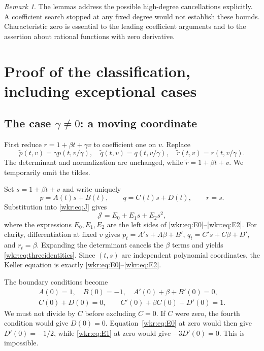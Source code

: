 \documentclass[11pt,a4paper]{article}
\numberwithin{equation}{section}
\theoremstyle{definition}
\theoremstyle{remark}
\newtheorem{remark}[theorem]{Remark}
\newcommand{\J}{\mathcal{J}}
\begin{document}
\begin{remark}
The lemmas address the possible high-degree cancellations explicitly. A
coefficient search stopped at any fixed degree would not establish these
bounds. Characteristic zero is essential to the leading coefficient
arguments and to the assertion about rational functions with zero derivative.
\end{remark}

\section{Proof of the classification, including exceptional cases}
\label{wkr:sec:proof}

\subsection{\texorpdfstring{The case $\gamma\ne0$: a moving coordinate}{The case gamma nonzero: a moving coordinate}}

First reduce $r=1+\beta t+\gamma v$ to coefficient one on $v$. Replace
\begin{equation}\label{wkr:eq:gammachange}
\widetilde p(t,v)=\gamma p(t,v/\gamma),\quad
\widetilde q(t,v)=q(t,v/\gamma),\quad
\widetilde r(t,v)=r(t,v/\gamma).
\end{equation}
The determinant and normalization are unchanged, while
$\widetilde r=1+\beta t+v$. We temporarily omit the tildes.

Set $s=1+\beta t+v$ and write uniquely
\begin{equation}\label{wkr:eq:ABCD}
p=A(t)s+B(t),\qquad q=C(t)s+D(t),\qquad r=s.
\end{equation}
Substitution into \eqref{wkr:eq:J} gives
\begin{equation}\label{wkr:eq:threeidentities}
\J=E_0+E_1s+E_2s^2,
\end{equation}
where the expressions $E_0,E_1,E_2$ are the left sides of
\eqref{wkr:eq:E0}--\eqref{wkr:eq:E2}. For clarity, differentiation at fixed $v$
gives $p_t=A's+A\beta+B'$, $q_t=C's+C\beta+D'$, and $r_t=\beta$.
Expanding the determinant cancels the $\beta$ terms and yields
\eqref{wkr:eq:threeidentities}. Since $(t,s)$ are independent polynomial
coordinates, the Keller equation is exactly
\eqref{wkr:eq:E0}--\eqref{wkr:eq:E2}.

The boundary conditions become
\begin{equation}\label{wkr:eq:boundaryABCD}
\begin{gathered}
A(0)=1,\quad B(0)=-1,\quad A'(0)+\beta+B'(0)=0,\\
C(0)+D(0)=0,\qquad C'(0)+\beta C(0)+D'(0)=1.
\end{gathered}
\end{equation}
We must not divide by $C$ before excluding $C=0$. If $C$ were zero, the
fourth condition would give $D(0)=0$. Equation~\eqref{wkr:eq:E0} at zero would
then give $D'(0)=-1/2$, while \eqref{wkr:eq:E1} at zero would give
$-3D'(0)=0$. This is impossible.
\end{document}
